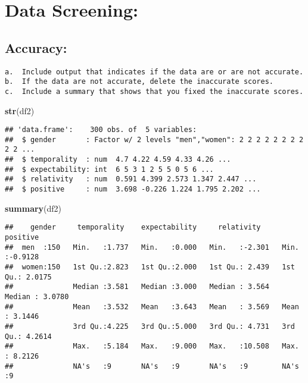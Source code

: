 \documentclass[
]{article}
\newenvironment{Shaded}{\begin{snugshade}}{\end{snugshade}}
\newcommand{\KeywordTok}[1]{\textcolor[rgb]{0.13,0.29,0.53}{\textbf{#1}}}
\newcommand{\NormalTok}[1]{#1}
\begin{document}
\hypertarget{data-screening}{%
\section{Data Screening:}\label{data-screening}}

\hypertarget{accuracy}{%
\subsection{Accuracy:}\label{accuracy}}

\begin{verbatim}
a.  Include output that indicates if the data are or are not accurate.
b.  If the data are not accurate, delete the inaccurate scores.
c.  Include a summary that shows that you fixed the inaccurate scores.
\end{verbatim}

\begin{Shaded}
\begin{Highlighting}[]
\KeywordTok{str}\NormalTok{(df2)}
\end{Highlighting}
\end{Shaded}

\begin{verbatim}
## 'data.frame':    300 obs. of  5 variables:
##  $ gender       : Factor w/ 2 levels "men","women": 2 2 2 2 2 2 2 2 2 2 ...
##  $ temporality  : num  4.7 4.22 4.59 4.33 4.26 ...
##  $ expectability: int  6 5 3 1 2 5 5 0 5 6 ...
##  $ relativity   : num  0.591 4.399 2.573 1.347 2.447 ...
##  $ positive     : num  3.698 -0.226 1.224 1.795 2.202 ...
\end{verbatim}

\begin{Shaded}
\begin{Highlighting}[]
\KeywordTok{summary}\NormalTok{(df2)}
\end{Highlighting}
\end{Shaded}

\begin{verbatim}
##    gender     temporality    expectability     relativity        positive      
##  men  :150   Min.   :1.737   Min.   :0.000   Min.   :-2.301   Min.   :-0.9128  
##  women:150   1st Qu.:2.823   1st Qu.:2.000   1st Qu.: 2.439   1st Qu.: 2.0175  
##              Median :3.581   Median :3.000   Median : 3.564   Median : 3.0780  
##              Mean   :3.532   Mean   :3.643   Mean   : 3.569   Mean   : 3.1446  
##              3rd Qu.:4.225   3rd Qu.:5.000   3rd Qu.: 4.731   3rd Qu.: 4.2614  
##              Max.   :5.184   Max.   :9.000   Max.   :10.508   Max.   : 8.2126  
##              NA's   :9       NA's   :9       NA's   :9        NA's   :9
\end{verbatim}
\end{document}
